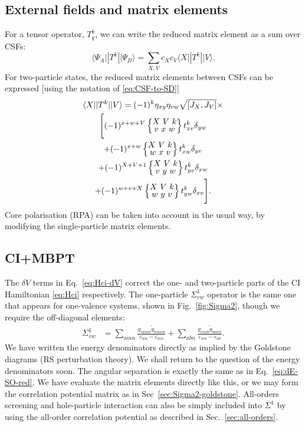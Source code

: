\documentclass[10pt,twocolumn,a4paper]{article}%
\newcommand{\bra}[1]{\ensuremath{\langle #1|}}	%
\newcommand{\ket}[1]{\ensuremath{|#1\rangle}}
\newcommand{\sixjs}[6]{\renewcommand\arraystretch{0.75}\ensuremath{\begin{Bmatrix}#1~#2~#3\\#4~#5~#6\end{Bmatrix}}}	%
\def\en{\ensuremath{\varepsilon}}
\begin{document}
\subsection{External fields and matrix elements}

For a tensor operator, $T^k_q$, we can write the reduced matrix element as a sum over CSFs:
\begin{equation}
    \bra{\Psi_A}|T^k|\ket{\Psi_B}
    = \sum_{X,V}c_X c_V \bra{X}|T^k|\ket{V}.
\end{equation}
For two-particle states, the reduced matrix elements between CSFs can be expressed [using the notation of \eqref{eq:CSF-to-SD}]
\begin{multline}
    \bra{X}|T^k|\ket{V}
    = (-1)^k\eta_{xy}\eta_{vw}\sqrt{[J_X,J_V]}\times\\ \Bigg[
    (-1)^{x+w+V}\sixjs{X}{V}{k}{v}{x}{w}t^k_{xv}\delta_{yw}\\
    +(-1)^{x+w}\sixjs{X}{V}{k}{w}{x}{v}t^k_{xw}\delta_{yv}\\
    +(-1)^{X+V+1}\sixjs{X}{V}{k}{v}{y}{w}t^k_{yv}\delta_{xw}\\
    +(-1)^{w+v+X}\sixjs{X}{V}{k}{w}{y}{v}t^k_{yw}\delta_{xv}
    \Bigg].
\end{multline}
Core polarisation (RPA) can be taken into account in the usual way, by modifying the single-particle matrix elements.

\subsection{CI+MBPT}

The $\delta V$ terms in Eq.~\eqref{eq:Hci-dV} correct the one- and two-particle parts of the CI Hamiltonian \eqref{eq:Hci} respectively.
The one-particle $\Sigma^1_{vw}$ operator is the same one that appears for one-valence systems, shown in Fig.~\ref{fig:Sigma2}, though we require the off-diagonal elements:
\begin{align}\label{eq:Sigma1_ab}
    \Sigma^1_{vw} &= 
    \sum_{amn}
    \frac{g_{vamn}\widetilde g_{nmaw}}{\en_{wa} - \en_{mn}}
    +\sum_{abn}
     \frac{g_{vnab}\widetilde g_{banw}}{\en_{wn}-\en_{ab}}.
\end{align}
We have written the energy denominators directly as implied by the Goldstone diagrams (RS perturbation theory). We shall return to the question of the energy denominators soon.
The angular separation is exactly the same as in Eq.~\eqref{eq:dE-SO-red}.
We have evaluate the matrix elements directly like this, or we may form the correlation potential matrix as in Sec~\ref{sec:Sigma2-goldstone}.
All-orders screening and hole-particle interaction can also be simply included into $\Sigma^1$ by using the all-order correlation potential as described in Sec.~\ref{sec:all-orders}.
\end{document}

